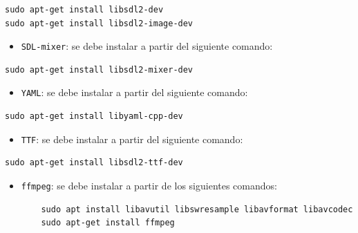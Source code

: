 \documentclass[a4paper]{article}
\begin{document}
\begin{verbatim}
sudo apt-get install libsdl2-dev
sudo apt-get install libsdl2-image-dev
\end{verbatim}

\begin{itemize}
	\item \texttt{SDL-mixer}: se debe instalar a partir del siguiente comando:
\end{itemize}

\begin{verbatim}
sudo apt-get install libsdl2-mixer-dev
\end{verbatim}

\begin{itemize}
	\item \texttt{YAML}: se debe instalar a partir del siguiente comando:
\end{itemize}

\begin{verbatim}
sudo apt-get install libyaml-cpp-dev
\end{verbatim}

\begin{itemize}
	\item \texttt{TTF}: se debe instalar a partir del siguiente comando:
\end{itemize}

\begin{verbatim}
sudo apt-get install libsdl2-ttf-dev
\end{verbatim}

\begin{itemize}
	\item \texttt{ffmpeg}: se debe instalar a partir de los siguientes comandos:
	
\begin{verbatim}
	sudo apt install libavutil libswresample libavformat libavcodec
	sudo apt-get install ffmpeg
\end{verbatim}
\end{itemize}
\end{document}
